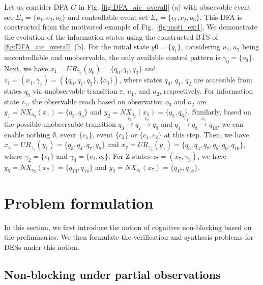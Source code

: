 \documentclass[journal,twoside,web]{ieeecolor}
\begin{document}
\begin{example}\label{ex:is_update}
    Let us consider DFA $G$ in Fig. \ref{fig:DFA_aic_overall} (a) with observable event set $\Sigma_o = \{o_1, o_2, o_3\}$ and controllable event set $\Sigma_c = \{ c_1, c_2, o_3 \}$. 
    This DFA is constructed from the motivated example of Fig.~\ref{fig:moti_ex:1}.
    We demonstrate the evolution of the information states using the constructed BTS of \ref{fig:DFA_aic_overall} (b).
    For the initial state $y0 = \{ q_1 \}$, considering $u_1, u_2$ being uncontrollable and unobservable, the only available control pattern is $\gamma_0 = \{ o_3 \}$.
    Next, we have $x_1 = UR_{\gamma_0}(y_0) = \{ q_0, q_1, q_2 \}$ and $z_1 = (x_1, \gamma_1) = (\{ q_0, q_1, q_2 \}, \{ o_3 \})$, where states $q_0$, $q_1$, $q_2$ are accessible from states $q_0$ via unobservable transition $\varepsilon$, $u_1$, and $u_2$, respectively.
    For information state $z_1$, the observable reach based on observation $o_3$ and $o_2$ are
    $y_1 = NX_{o_3}(x_1) = \{ q_3, q_4 \}$ and $y_2 = NX_{o_2}(x_1) = \{ q_5, q_6 \}$.
    Similarly, based on the possible unobservable transition $q_3 \xrightarrow{c_1} q_7 \xrightarrow{c_2} q_9$ and $q_4 \xrightarrow{c_1} q_8 \xrightarrow{c_2} q_{10}$, we can enable nothing $\emptyset$, event $\{ c_1 \}$, event $\{ c_2 \}$ or $\{c_1, c_2 \}$ at this step.
    Then, we have
    $x_4 = UR_{\gamma_2}(y_1) = \{ q_3, q_4, q_7, q_8 \}$ and
    $x_7 = UR_{\gamma_3}(y_1) = \{ q_3, q_4, q_7, q_8, q_9, q_{10} \}$,
    where $\gamma_2 = \{ c_1 \}$ and $\gamma_3 = \{ c_1, c_2 \}$.
    For Z-states $z_7 = (x_7, \gamma_3)$, we have
    $y_5 = NX_{o_2}(x_7) = \{ q_{13}, q_{14} \}$ and
    $y_3 = NX_{o_1}(x_7) = \{ q_{17}, q_{18} \}$.
\end{example}

%
\section{Problem formulation}\label{sec:prob}

In this section, we first introduce the notion of cognitive non-blocking based on the preliminaries. 
We then formulate the verification and synthesis problems for DESs under this notion.

\subsection{Non-blocking under partial observations}
\end{document}
